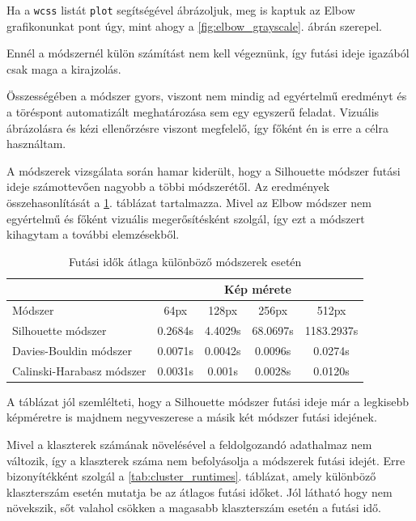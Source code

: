 Ha a \texttt{wcss} listát \texttt{plot} segítségével ábrázoljuk, meg is kaptuk az Elbow grafikonunkat pont úgy, mint ahogy a \ref{fig:elbow_grayscale}. ábrán szerepel.

Ennél a módszernél külön számítást nem kell végeznünk, így futási ideje igazából csak maga a kirajzolás.

Összességében a módszer gyors, viszont nem mindig ad egyértelmű eredményt és a töréspont automatizált meghatározása sem egy egyszerű feladat. Vizuális ábrázolásra és kézi ellenőrzésre viszont megfelelő, így főként én is erre a célra használtam.


A módszerek vizsgálata során hamar kiderült, hogy a Silhouette módszer futási ideje számottevően nagyobb a többi módszerétől. Az eredmények összehasonlítását a \ref{tab:size_runtimes}. táblázat tartalmazza. Mivel az Elbow módszer nem egyértelmű és főként vizuális megerősítésként szolgál, így ezt a módszert kihagytam a további elemzésekből.

\begin{table}[h]
\centering
\caption{Futási idők átlaga különböző módszerek esetén}
\label{tab:size_runtimes}
\medskip
\begin{tabular}{|l|c|c|c|c|}
\cline{2-5}
 \multicolumn{1}{c|}{} & \multicolumn{4}{c|}{Kép mérete} \\
 \hline
 Módszer & 64px & 128px & 256px & 512px \\
\hline
Silhouette módszer & 0.2684s & 4.4029s & 68.0697s & 1183.2937s \\
Davies-Bouldin módszer & 0.0071s & 0.0042s & 0.0096s & 0.0274s \\
Calinski-Harabasz módszer & 0.0031s & 0.001s & 0.0028s & 0.0120s \\
\hline
\end{tabular}
\end{table}

A táblázat jól szemlélteti, hogy a Silhouette módszer futási ideje már a legkisebb képméretre is majdnem negyveszerese a másik két módszer futási idejének.

Mivel a klaszterek számának növelésével a feldolgozandó adathalmaz nem változik, így a klaszterek száma nem befolyásolja a módszerek futási idejét. Erre bizonyítékként szolgál a \ref{tab:cluster_runtimes}. táblázat, amely különböző klaszterszám esetén mutatja be az átlagos futási időket. Jól látható hogy nem növekszik, sőt valahol csökken a magasabb klaszterszám esetén a futási idő.

